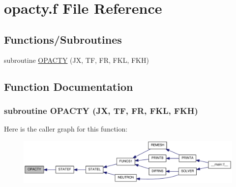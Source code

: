 \hypertarget{opacty_8f}{
\section{opacty.f File Reference}
\label{opacty_8f}
}
\subsection*{Functions/Subroutines}
\begin{DoxyCompactItemize}
\item 
subroutine \hyperlink{opacty_8f_ae436041cf48ebdd3463f8ba6247e8cd2}{OPACTY} (JX, TF, FR, FKL, FKH)
\end{DoxyCompactItemize}


\subsection{Function Documentation}
\hypertarget{opacty_8f_ae436041cf48ebdd3463f8ba6247e8cd2}{
\subsubsection[{OPACTY}]{\setlength{\rightskip}{0pt plus 5cm}subroutine OPACTY (JX, \/  TF, \/  FR, \/  FKL, \/  FKH)}}
\label{opacty_8f_ae436041cf48ebdd3463f8ba6247e8cd2}


Here is the caller graph for this function:\nopagebreak
\begin{figure}[H]
\begin{center}
\leavevmode
\includegraphics[width=337pt]{opacty_8f_ae436041cf48ebdd3463f8ba6247e8cd2_icgraph}
\end{center}
\end{figure}
